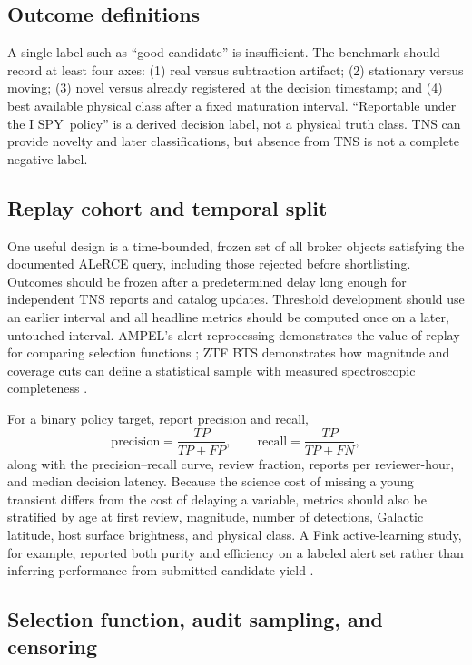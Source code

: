 \documentclass[11pt]{article}
\newcommand{\legacycampaign}{I SPY}
\begin{document}
\subsection{Outcome definitions}

A single label such as ``good candidate'' is insufficient. The benchmark should record at least four axes: (1) real versus subtraction artifact; (2) stationary versus moving; (3) novel versus already registered at the decision timestamp; and (4) best available physical class after a fixed maturation interval. ``Reportable under the \legacycampaign\ policy'' is a derived decision label, not a physical truth class. TNS can provide novelty and later classifications, but absence from TNS is not a complete negative label.

\subsection{Replay cohort and temporal split}

One useful design is a time-bounded, frozen set of all broker objects satisfying the documented ALeRCE query, including those rejected before shortlisting. Outcomes should be frozen after a predetermined delay long enough for independent TNS reports and catalog updates. Threshold development should use an earlier interval and all headline metrics should be computed once on a later, untouched interval. AMPEL's alert reprocessing demonstrates the value of replay for comparing selection functions \citep{nordin2019}; ZTF BTS demonstrates how magnitude and coverage cuts can define a statistical sample with measured spectroscopic completeness \citep{perley2020}.

For a binary policy target, report precision and recall,
\begin{equation}
  \mathrm{precision}=\frac{TP}{TP+FP}, \qquad
  \mathrm{recall}=\frac{TP}{TP+FN},
\end{equation}
along with the precision--recall curve, review fraction, reports per reviewer-hour, and median decision latency. Because the science cost of missing a young transient differs from the cost of delaying a variable, metrics should also be stratified by age at first review, magnitude, number of detections, Galactic latitude, host surface brightness, and physical class. A Fink active-learning study, for example, reported both purity and efficiency on a labeled alert set rather than inferring performance from submitted-candidate yield \citep{leoni2022}.

\subsection{Selection function, audit sampling, and censoring}
\end{document}

